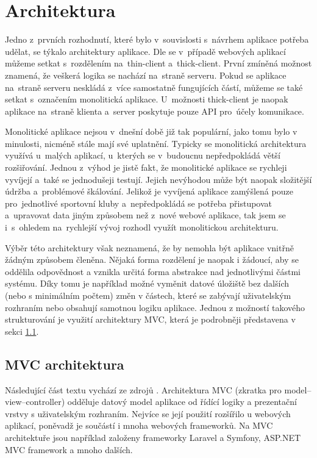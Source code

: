\section{Architektura}
Jedno z~prvních rozhodnutí, které bylo v~souvislosti s~návrhem aplikace potřeba udělat, se týkalo architektury aplikace. Dle \cite{twa_architecture} se v~případě webových aplikací můžeme setkat s~rozdělením na~thin-client a~thick-client. První zmíněná možnost znamená, že veškerá logika se nachází na~straně serveru. Pokud se aplikace na~straně serveru neskládá z~více samostatně fungujících částí, můžeme se také setkat s~označením monolitická aplikace. U~možnosti thick-client je naopak aplikace na~straně klienta a~server poskytuje pouze API pro~účely komunikace.

Monolitické aplikace nejsou v~dnešní době již tak populární, jako tomu bylo v minulosti, nicméně stále mají své uplatnění. Typicky se monolitická architektura využívá u~malých aplikací, u~kterých se v~budoucnu nepředpokládá větší rozšiřování. Jednou z~výhod je jistě fakt, že monolitické aplikace se rychleji vyvíjejí a~také se jednodušeji testují. Jejich nevýhodou může být naopak složitější údržba a~problémové škálování. \cite{twa_architecture, monolithic_architecture} Jelikož je vyvíjená aplikace zamýšlená pouze pro~jednotlivé sportovní kluby a~nepředpokládá se potřeba přistupovat a~upravovat data jiným způsobem než z~nové webové aplikace, tak jsem se i~s~ohledem na~rychlejší vývoj rozhodl využít monolitickou architekturu.

Výběr této architektury však neznamená, že by nemohla být aplikace vnitřně žádným způsobem členěna. Nějaká forma rozdělení je naopak i žádoucí, aby se oddělila odpovědnost a vznikla určitá forma abstrakce nad jednotlivými částmi systému. Díky tomu je například možné vyměnit datové úložiště bez dalších (nebo s minimálním počtem) změn v částech, které se zabývají uživatelským rozhraním nebo obsahují samotnou logiku aplikace. Jednou z možností takového strukturování je využití architektury MVC, která je podrobněji představena v sekci \ref{section:mvc}.

\subsection{MVC architektura}\label{section:mvc}
Následující část textu vychází ze zdrojů \cite{it_network_mvc, mdn_mvc}. Architektura MVC (zkratka pro model–view–controller) odděluje datový model aplikace od řídící logiky a prezentační vrstvy s uživatelským rozhraním. Nejvíce se její použití rozšířilo u webových aplikací, poněvadž je součástí i mnoha webových frameworků. Na MVC architektuře jsou například založeny frameworky Laravel a Symfony, ASP.NET MVC framework a mnoho dalších.

